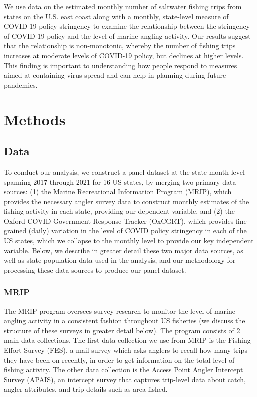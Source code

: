 \documentclass[12pt]{article}
\begin{document}
We use data on the estimated monthly number of saltwater fishing trips from states on the U.S. east coast along with a monthly, state-level measure of COVID-19 policy stringency to examine the relationship between the stringency of COVID-19 policy and the  level of marine angling activity. Our results suggest that the relationship is non-monotonic, whereby the number of fishing trips increases at moderate levels of COVID-19 policy, but declines at higher levels. This finding is important to understanding how people respond to measures aimed at containing virus spread and can help in planning during future pandemics.

\section{Methods}

\subsection{Data}

To conduct our analysis, we construct a panel dataset at the state-month
level spanning 2017 through 2021 for 16 US states, by merging two
primary data sources: (1) the Marine Recreational Information Program
(MRIP), which provides the necessary angler survey data to construct
monthly estimates of the fishing activity in each state, providing our
dependent variable, and (2) the Oxford COVID Government Response Tracker
(OxCGRT), which provides fine-grained (daily) variation in the level of
COVID policy stringency in each of the US states, which we collapse to
the monthly level to provide our key independent variable. Below, we
describe in greater detail these two major data sources, as well as
state population data used in the analysis, and our methodology for
processing these data sources to produce our panel dataset.

\subsubsection{MRIP}

The MRIP program oversees survey research to monitor the level of marine
angling activity in a consistent fashion throughout US fisheries (we
discuss the structure of these surveys in greater detail below). The
program consists of 2 main data collections. The first data collection
we use from MRIP is the Fishing Effort Survey (FES), a mail survey which
asks anglers to recall how many trips they have been on recently, in
order to get information on the total level of fishing activity. The
other data collection is the Access Point Angler Intercept Survey
(APAIS), an intercept survey that captures trip-level data about catch,
angler attributes, and trip details such as area fished.
\end{document}
